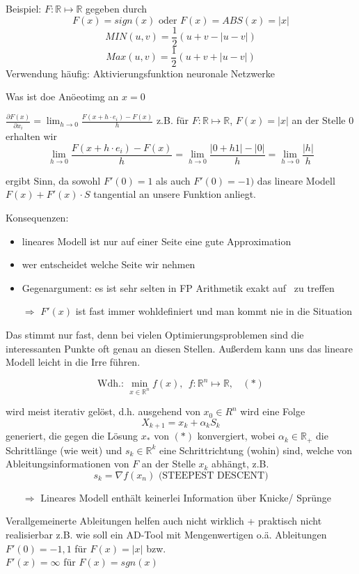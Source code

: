 Beispiel: $F:\mathbb{R}\mapsto\mathbb{R}$ gegeben durch
$$F(x) = sign(x) \text{ oder } F(x) = ABS(x) = |x|$$
$$MIN(u,v) = \frac{1}{2}(u+v -|u-v|)$$
$$Max(u,v) = \frac{1}{2}(u+v +|u-v|)$$
Verwendung häufig: Aktivierungsfunktion neuronale Netzwerke

Was ist doe Anöeotimg an $x=0$

$\frac{\partial F(x)}{\partial x_i} = \lim_{h\rightarrow 0} \frac{F(x+h\cdot e_i)-F(x)}{h}$
z.B. für $F:\mathbb{R}\mapsto\mathbb{R}$, $F(x) = |x|$ an der Stelle 0 erhalten wir
$$\lim_{h\rightarrow 0} \frac{F(x+h\cdot e_i)-F(x)}{h} = \lim_{h\rightarrow 0}\frac{|0+h1|-|0|}{h} = \lim_{h\rightarrow 0}\frac{|h|}{h}$$





ergibt Sinn, da sowohl $F'(0) =1$ als auch $F'(0)=-1)$ das lineare Modell $F(x) + F'(x)\cdot S$ tangential an unsere Funktion anliegt.

Konsequenzen:
\begin{itemize}
	\item lineares Modell ist nur auf einer Seite eine gute Approximation
	\item wer entscheidet \glqq welche Seite wir nehmen \grqq
	\item Gegenargument: es ist sehr selten in FP Arithmetik exakt auf \grqq\ zu treffen
	\item[$\Rightarrow$] $F'(x)$ ist fast immer wohldefiniert und man kommt nie in die Situation
\end{itemize}
\noindent
Das stimmt nur fast, denn bei vielen Optimierungsproblemen sind die interessanten Punkte oft genau an diesen Stellen. Außerdem kann uns das lineare Modell leicht in die Irre führen.

$$\text{Wdh.: } \min_{x\in \mathbb{R}^n}f(x),\ \ f:\mathbb{R}^n\mapsto \mathbb{R},\ \ \ \ (*)$$

wird meist iterativ gelöst, d.h. ausgehend von $x_0 \in R^n$ wird eine Folge
$$X_{k+1}= x_k+\alpha_kS_k$$
generiert, die gegen die Lösung $x_*$ von $(*)$ konvergiert, wobei $\alpha_k \in \mathbb{R}_+$ die Schrittlänge (wie weit) und $s_k \in \mathbb{R}^k$ eine Schrittrichtung (wohin) sind, welche von Ableitungsinformationen von $F$ an der Stelle $x_k$ abhängt, z.B. $$s_k =\nabla f(x_n)\text{ (STEEPEST DESCENT)}$$
\begin{itemize}
	\item[$\Rightarrow$] Lineares Modell enthält keinerlei Information über Knicke/ Sprünge
\end{itemize}
Verallgemeinerte Ableitungen helfen auch nicht wirklich + praktisch nicht realisierbar
z.B. wie soll ein AD-Tool mit Mengenwertigen o.ä. Ableitungen\\ $F'(0)={-1,1}$ für $F(x)=|x|$ bzw. \\$F'(x)=\infty$ für $F(x)=sgn(x)$

